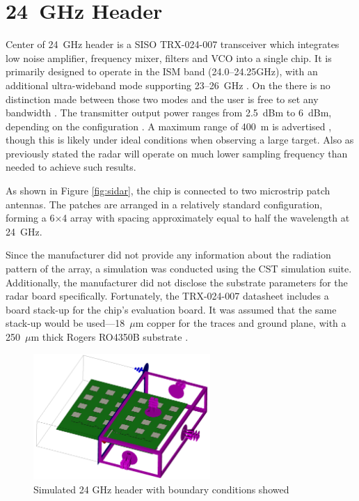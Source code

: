 \section{24~GHz Header}

Center of 24~GHz header is a SISO TRX-024-007 transceiver which integrates low noise amplifier, frequency mixer, filters and VCO into a single chip.
It is primarily designed to operate in the ISM band (24.0--24.25GHz), with an additional ultra-wideband mode supporting 23--26~GHz \cite{sidarTRX24}.
On the \sidar there is no distinction made between  those two modes and the user is free to set any bandwidth \cite{sidarPRO} .
The transmitter output power ranges from 2.5~dBm to 6~dBm, depending on the configuration \cite{sidarTRX24}.
A maximum range of 400~m is advertised \cite{sidarMANOld}, though this is likely under ideal conditions when observing a large target.
Also as previously stated the radar will operate on much lower sampling frequency than needed to achieve such results.


As shown in Figure \ref{fig:sidar}, the chip is connected to two microstrip patch antennas.
The patches are arranged in a relatively standard configuration, forming a 6×4 array with spacing approximately equal to half the wavelength at 24~GHz.

Since the manufacturer did not provide any information about the radiation pattern of the array, a simulation was conducted using the CST simulation suite.
Additionally, the manufacturer did not disclose the substrate parameters for the radar board specifically.
Fortunately, the TRX-024-007 datasheet includes a board stack-up for the chip's evaluation board.
It was assumed that the same stack-up would be used—18~$\mu$m copper for the traces and ground plane, with a 250~$\mu$m thick Rogers RO4350B substrate \cite{sidarTRX24}.

\begin{figure}[ht!]
	\centering
	\includegraphics[width=0.6\textwidth]{../img/boundaries.png}
	\caption[Simulated 24 GHz header with boundary conditions showed]{Simulated 24 GHz header with boundary conditions showed}
	\label{fig:boundaries}
\end{figure}

